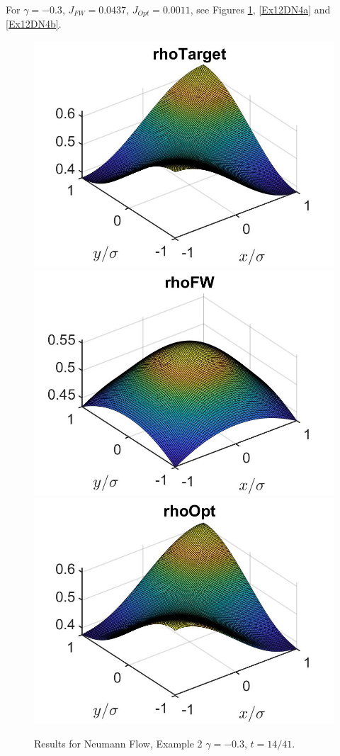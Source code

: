 \documentclass[11pt, a4paper]{article}
\theoremstyle{definition}
\begin{document}
For $\gamma = -0.3$, $J_{FW} = 0.0437$, $J_{Opt} = 0.0011$, see Figures \ref{Ex12DN4}, \ref{Ex12DN4a} and \ref{Ex12DN4b}.
\begin{figure}[h]
	\includegraphics[scale=0.3]{rhoHat2DN4.jpg}
	\includegraphics[scale=0.3]{rhoFW2DN4a.jpg}
	\includegraphics[scale=0.3]{rhoOpt2D4.jpg}
	\caption{Results for Neumann Flow, Example 2 $\gamma = -0.3$, $t = 14/41$.}
	\label{Ex12DN4}
\end{figure}
\end{document}
